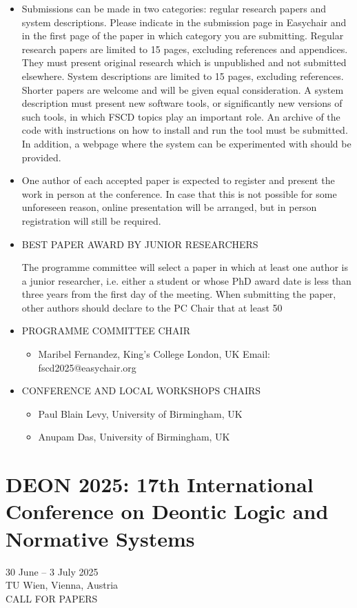 \documentclass[prodmode,acmtecs]{acmsmall} %
\begin{document}
\begin{itemize}
\item  Submissions can be made in two categories: regular research papers and system descriptions. Please indicate in the submission page in Easychair and in the first page of the paper in which category you are submitting. Regular research papers are limited to 15 pages, excluding references and appendices. They must present original research which is unpublished and not submitted elsewhere. System descriptions are limited to 15 pages, excluding references. Shorter papers are welcome and will be given equal consideration. A system description must present new software tools, or significantly new versions of such tools, in which FSCD topics play an important role. An archive of the code with instructions on how to install and run the tool must be submitted. In addition, a webpage where the system can be experimented with should be provided. 
 
\item  One author of each accepted paper is expected to register and present the work in person at the conference. In case that this is not possible for some unforeseen reason, online presentation will be arranged, but in person registration will still be required. 
 
\item  BEST PAPER AWARD BY JUNIOR RESEARCHERS 
 
  The programme committee will select a paper in which at least one author is a junior researcher, i.e. either a student or whose PhD award date is less than three years from the first day of the meeting. When submitting the paper, other authors should declare to the PC Chair that at least 50%
 
\item  PROGRAMME COMMITTEE CHAIR 
 
\begin{itemize}\item Maribel Fernandez, King's College London, UK Email: fscd2025@easychair.org
\end{itemize} 
\item  CONFERENCE AND LOCAL WORKSHOPS CHAIRS 
 
\begin{itemize}\item  Paul Blain Levy, University of Birmingham, UK
\item  Anupam Das, University of Birmingham, UK
\end{itemize} 
\end{itemize}\section{DEON 2025: 17th International Conference on Deontic Logic and Normative Systems}\label{DEON2025}  30 June – 3 July 2025\\ 
  TU Wien, Vienna, Austria\\ 
CALL FOR PAPERS 
\end{document}
